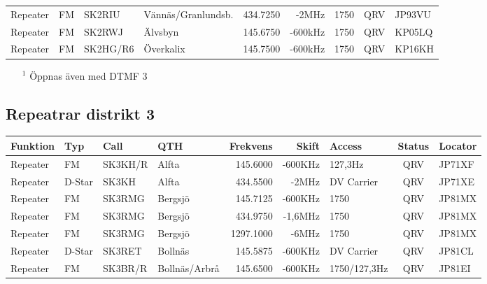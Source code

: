 \documentclass[10pt,swedish,a4paper,twoside]{article}
\begin{document}
\begin{landscape}
\begin{longtable}{llllrrlcl}
	Repeater          & FM           & SK2RIU        & Vännäs/Granlundsb. &          434.7250 &          -2MHz & 1750             &       QRV       & JP93VU           \\
	Repeater          & FM           & SK2RWJ        & Älvsbyn            &          145.6750 &        -600kHz & 1750             &       QRV       & KP05LQ           \\
	Repeater          & FM           & SK2HG/R6      & Överkalix          &          145.7500 &        -600kHz & 1750             &       QRV       & KP16KH
\end{longtable}
\begin{itemize}
	\item[$^1$] Öppnas även med DTMF 3
\end{itemize}
\normalsize
\subsection{Repeatrar distrikt 3}
\footnotesize
\begin{longtable}{llllrrlcl}
	\textbf{Funktion} & \textbf{Typ} & \textbf{Call} & \textbf{QTH}     & \textbf{Frekvens} & \textbf{Skift} & \textbf{Access} & \textbf{Status} & \textbf{Locator} \\ \hline
	Repeater          & FM           & SK3KH/R       & Alfta            &          145.6000 &        -600KHz & 127,3Hz         &       QRV       & JP71XF           \\
	Repeater          & D-Star       & SK3KH         & Alfta            &          434.5500 &          -2MHz & DV Carrier      &       QRV       & JP71XE           \\
	Repeater          & FM           & SK3RMG        & Bergsjö          &          145.7125 &        -600KHz & 1750            &       QRV       & JP81MX           \\
	Repeater          & FM           & SK3RMG        & Bergsjö          &          434.9750 &        -1,6MHz & 1750            &       QRV       & JP81MX           \\
	Repeater          & FM           & SK3RMG        & Bergsjö          &         1297.1000 &          -6MHz & 1750            &       QRV       & JP81MX           \\
	Repeater          & D-Star       & SK3RET        & Bollnäs          &          145.5875 &        -600KHz & DV Carrier      &       QRV       & JP81CL           \\
	Repeater          & FM           & SK3BR/R       & Bollnäs/Arbrå    &          145.6500 &        -600KHz & 1750/127,3Hz    &       QRV       & JP81EI           \\

\end{longtable}
\end{landscape}
\end{document}
